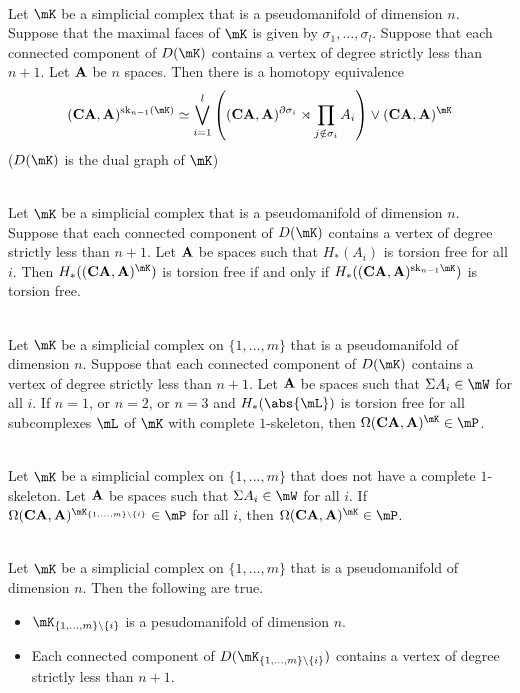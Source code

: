 \documentclass[a4paper]{article}
\begin{document}
\begin{thm}{}{}\\
Let $\mK$ be a simplicial complex that is a pseudomanifold of dimension $n$. Suppose that the maximal faces of $\mK$ is given by $\sigma_1,\dots,\sigma_l$. Suppose that each connected component of $D(\mK)$ contains a vertex of degree strictly less than $n+1$. Let $\bold{A}$ be $n$ spaces. Then there is a homotopy equivalence $$(\bold{CA},\bold{A})^{\text{sk}_{n-1}(\mK)}\simeq\bigvee_{i=1}^l\left((\bold{CA},\bold{A})^{\partial\sigma_i}\rtimes\prod_{j\notin\sigma_i}A_i\right)\vee(\bold{CA},\bold{A})^\mK$$ ($D(\mK)$ is the dual graph of $\mK$)
\end{thm}

\begin{thm}{}{}\\
Let $\mK$ be a simplicial complex that is a pseudomanifold of dimension $n$. Suppose that each connected component of $D(\mK)$ contains a vertex of degree strictly less than $n+1$. Let $\bold{A}$ be spaces such that $H_\ast(A_i)$ is torsion free for all $i$. Then $H_\ast((\bold{CA},\bold{A})^\mK)$ is torsion free if and only if $H_\ast((\bold{CA},\bold{A})^{\text{sk}_{n-1}\mK})$ is torsion free. 
\end{thm}

\begin{thm}{}{}\\
Let $\mK$ be a simplicial complex on $\{1,\dots,m\}$ that is a pseudomanifold of dimension $n$. Suppose that each connected component of $D(\mK)$ contains a vertex of degree strictly less than $n+1$. Let $\bold{A}$ be spaces such that $\Sigma A_i\in\mW$ for all $i$. If $n=1$, or $n=2$, or $n=3$ and $H_\ast(\abs{\mL})$ is torsion free for all subcomplexes $\mL$ of $\mK$ with complete $1$-skeleton, then $\Omega(\bold{CA},\bold{A})^\mK\in\mP$. 
\end{thm}

\begin{thm}{}{}\\
Let $\mK$ be a simplicial complex on $\{1,\dots,m\}$ that does not have a complete $1$-skeleton. Let $\bold{A}$ be spaces such that $\Sigma A_i\in\mW$ for all $i$. If $\Omega(\bold{CA},\bold{A})^{\mK_{\{1,\dots,m\}\setminus\{i\}}}\in\mP$ for all $i$, then $\Omega(\bold{CA},\bold{A})^\mK\in\mP$. 
\end{thm}

\begin{thm}{}{}\\
Let $\mK$ be a simplicial complex on $\{1,\dots,m\}$ that is a pseudomanifold of dimension $n$. Then the following are true. 
\begin{itemize}
\item $\mK_{\{1,\dots,m\}\setminus\{i\}}$ is a pesudomanifold of dimension $n$. 
\item Each connected component of $D(\mK_{\{1,\dots,m\}\setminus\{i\}})$ contains a vertex of degree strictly less than $n+1$. 
\end{itemize}
\end{thm}
\end{document}
